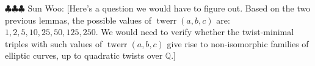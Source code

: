 \documentclass[12pt]{amsart}
\numberwithin{equation}{section} %
\theoremstyle{definition} \newtheorem{definition}[counter]{Definition}
\theoremstyle{remark} \newtheorem{nonexam}[counter]{Non-example}
\newcommand{\spark}[1]{{\color{olive} \sf
    $\clubsuit\clubsuit\clubsuit$ Sun Woo: [#1]}}
\DeclareMathOperator{\twerr}{twerr} %
\begin{document}
\spark{Here's a question we would have to figure out. Based on the two previous lemmas, the possible values of $\twerr(a,b,c)$ are: $1, 2, 5, 10, 25, 50, 125, 250$. We would need to verify whether the twist-minimal triples with such values of $\twerr(a,b,c)$ give rise to non-isomorphic families of elliptic curves, up to quadratic twists over $\mathbb{Q}$.}


\clearpage
{} 
\end{document}
